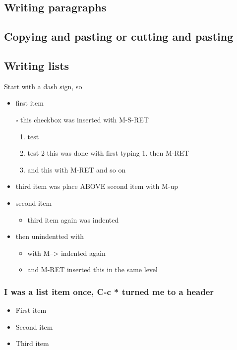 \documentclass[11pt]{article}
\begin{document}
\subsection{Writing paragraphs}
\label{sec:org8f0f04f}
\subsection{Copying and pasting or cutting and pasting}
\label{sec:org8356bcd}

\subsection{Writing lists}
\label{sec:orgb1b523a}
Start with a dash sign, so

\begin{itemize}
\item first item
\item[{$\square$}] this checkbox was inserted with M-S-RET
\begin{enumerate}
\item test
\item test 2 this was done with first typing 1. then M-RET
\item and this with M-RET and so on
\end{enumerate}
\item third item was place ABOVE second item with M-up
\item second item
\begin{itemize}
\item third item again was indented
\end{itemize}
\item then unindentted with 
\begin{itemize}
\item with M--> indented again
\item and M-RET inserted this in the same level
\end{itemize}
\end{itemize}
\subsubsection{I was a list item once, C-c * turned me to a header}
\label{sec:org144a306}

\begin{itemize}
\item First item
\item Second item
\item Third item
\end{itemize}
\end{document}
